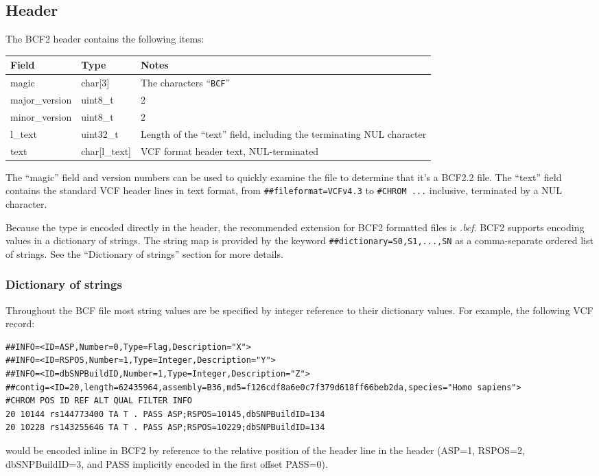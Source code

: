 \documentclass[8pt]{article}
\begin{document}
\subsection{Header}

The BCF2 header contains the following items:

\vspace{0.3cm}
{\small
\begin{tabular}{|l | l | p{30em} | } \hline
\textbf{Field} & \textbf{Type} & \textbf{Notes} \\ \hline
magic          & char[3]     & The characters ``{\tt BCF}'' \\ \hline
major\_version & uint8\_t    & 2 \\ \hline
minor\_version & uint8\_t    & 2 \\ \hline
l\_text        & uint32\_t   & Length of the ``text'' field, including the terminating NUL character \\ \hline
text           & char[l\_text] & VCF format header text, NUL-terminated \\ \hline
\end{tabular}}
\vspace{0.3cm}

The ``magic'' field and version numbers can be used to quickly examine the file to determine that it's a BCF2.2 file.
The ``text'' field contains the standard VCF header lines in text format, from \verb|##fileformat=VCFv4.3|
to \verb|#CHROM ...| inclusive, terminated by a NUL character.

Because the type is encoded directly in the header, the recommended extension for BCF2 formatted files is {\sl .bcf}.
BCF2 supports encoding values in a dictionary of strings.
The string map is provided by the keyword \verb|##dictionary=S0,S1,...,SN| as a comma-separate ordered list of strings.
See the ``Dictionary of strings'' section for more details.

\subsubsection{Dictionary of strings}

Throughout the BCF file most string values are be specified by integer reference to their dictionary values.
For example, the following VCF record:
\small
\begin{verbatim}
##INFO=<ID=ASP,Number=0,Type=Flag,Description="X">
##INFO=<ID=RSPOS,Number=1,Type=Integer,Description="Y">
##INFO=<ID=dbSNPBuildID,Number=1,Type=Integer,Description="Z">
##contig=<ID=20,length=62435964,assembly=B36,md5=f126cdf8a6e0c7f379d618ff66beb2da,species="Homo sapiens">
#CHROM POS ID REF ALT QUAL FILTER INFO
20 10144 rs144773400 TA T . PASS ASP;RSPOS=10145,dbSNPBuildID=134
20 10228 rs143255646 TA T . PASS ASP;RSPOS=10229;dbSNPBuildID=134
\end{verbatim}
\normalsize
would be encoded inline in BCF2 by reference to the relative position of the header line in the header (ASP=1, RSPOS=2, dbSNPBuildID=3, and PASS implicitly encoded in the first offset PASS=0).
\end{document}
